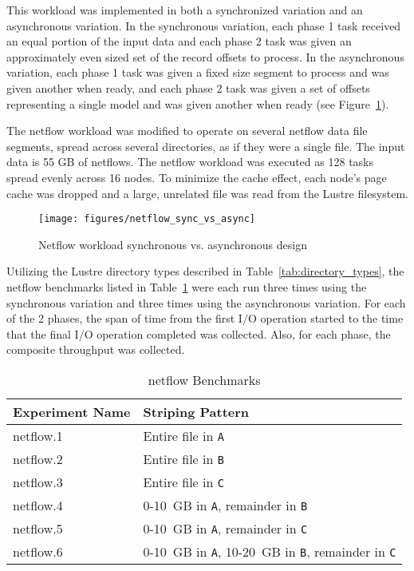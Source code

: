 \documentclass[conference,compsoc]{IEEEtran}
\begin{document}
This workload was implemented in both a synchronized variation and an asynchronous variation. In the synchronous variation, each phase 1 task received an equal portion of the input data and each phase 2 task was given an approximately even sized set of the record offsets to process. In the asynchronous variation, each phase 1 task was given a fixed size segment to process and was given another when ready, and each phase 2 task was given a set of offsets representing a single model and was given another when ready (see Figure~\ref{fig:netflow}).

The netflow workload was modified to operate on several netflow data file segments, spread across several directories, as if they were a single file. The input data is 55 GB of netflows. The netflow workload was executed as 128 tasks spread evenly across 16 nodes. To minimize the cache effect, each node's page cache was dropped and a large, unrelated file was read from the Lustre filesystem.

\begin{figure}[t]
\centering
  \texttt{[image: figures/netflow\_sync\_vs\_async]}
\caption{Netflow workload \- synchronous vs. asynchronous design}
\label{fig:netflow}
\end{figure}

Utilizing the Lustre directory types described in Table~\ref{tab:directory_types}, the 
netflow benchmarks listed in Table~\ref{tab:netflow_benchmarks} were each run three times using the synchronous variation and three times using the asynchronous variation. For each of the 2 phases, the span of time from the first I$/$O operation started to the time that the final I$/$O operation completed was collected. Also, for each phase, the composite throughput was collected.

\begin{table}[h]
\centering
\caption{netflow Benchmarks}
\label{tab:netflow_benchmarks}
\begin{tabular}{ll}
Experiment Name & Striping Pattern \\
\hline
netflow.1 & Entire file in \texttt{A} \\
netflow.2 & Entire file in \texttt{B} \\
netflow.3 & Entire file in \texttt{C} \\
netflow.4 & 0-10~GB in \texttt{A}, remainder in \texttt{B} \\
netflow.5 & 0-10~GB in \texttt{A}, remainder in \texttt{C} \\
netflow.6 & 0-10~GB in \texttt{A}, 10-20~GB in \texttt{B}, remainder in \texttt{C} \\
\end{tabular}
\end{table}
\end{document}
